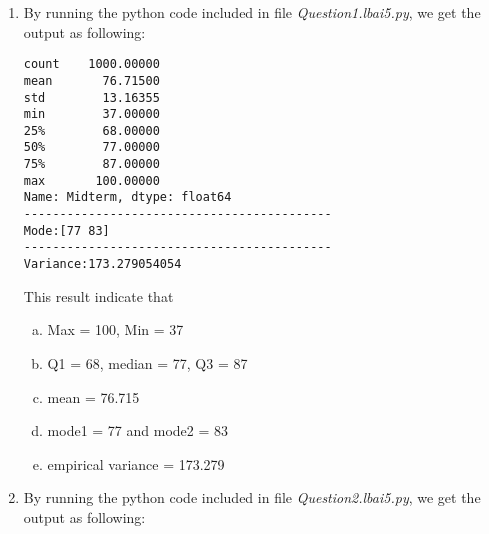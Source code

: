 \documentclass[11pt]{article}
\begin{document}
	\begin{enumerate}
		\item By running the python code included in file \textit{Question1.lbai5.py}, we get the output as following:
			
	\begin{lstlisting}
count    1000.00000
mean       76.71500
std        13.16355
min        37.00000
25%        68.00000
50%        77.00000
75%        87.00000
max       100.00000
Name: Midterm, dtype: float64
-------------------------------------------
Mode:[77 83]
-------------------------------------------
Variance:173.279054054
	\end{lstlisting}
	
	This result indicate that
		\begin{enumerate}[a.]
			\item Max = 100, Min = 37
			\item Q1 = 68, median = 77, Q3 = 87
			\item mean = 76.715
			\item mode1 = 77 and mode2 = 83
			\item empirical variance = 173.279
		\end{enumerate}
		
		\item By running the python code included in file \textit{Question2.lbai5.py}, we get the output as following:
		

\end{enumerate}
\end{document}
